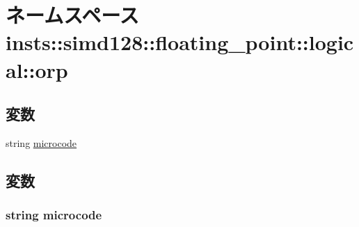 \hypertarget{namespaceinsts_1_1simd128_1_1floating__point_1_1logical_1_1orp}{
\section{ネームスペース insts::simd128::floating\_\-point::logical::orp}
\label{namespaceinsts_1_1simd128_1_1floating__point_1_1logical_1_1orp}
}
\subsection*{変数}
\begin{DoxyCompactItemize}
\item 
string \hyperlink{namespaceinsts_1_1simd128_1_1floating__point_1_1logical_1_1orp_a770f11a173e99389a8802f0107ed8f52}{microcode}
\end{DoxyCompactItemize}


\subsection{変数}
\hypertarget{namespaceinsts_1_1simd128_1_1floating__point_1_1logical_1_1orp_a770f11a173e99389a8802f0107ed8f52}{
\subsubsection[{microcode}]{\setlength{\rightskip}{0pt plus 5cm}string {\bf microcode}}}
\label{namespaceinsts_1_1simd128_1_1floating__point_1_1logical_1_1orp_a770f11a173e99389a8802f0107ed8f52}
